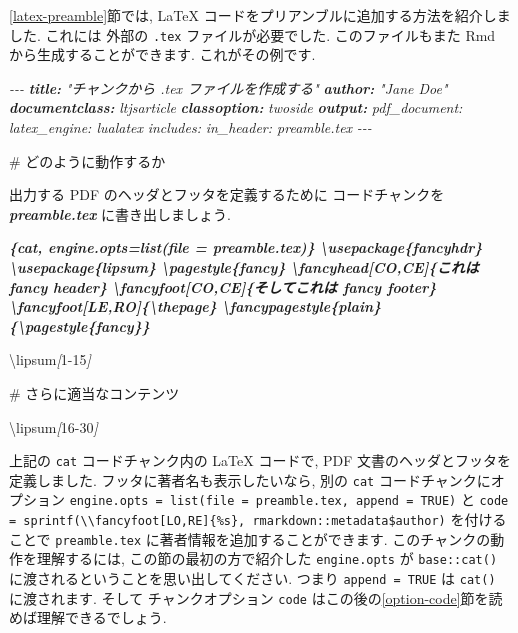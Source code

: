 \documentclass[
  11pt,
  lualatex,
  ja=standard]{bxjsreport}
\newenvironment{Shaded}{\begin{snugshade}}{\end{snugshade}}
\newcommand{\AnnotationTok}[1]{\textcolor[rgb]{0.56,0.35,0.01}{\textbf{\textit{#1}}}}
\newcommand{\CommentTok}[1]{\textcolor[rgb]{0.56,0.35,0.01}{\textit{#1}}}
\newcommand{\FunctionTok}[1]{\textcolor[rgb]{0.00,0.00,0.00}{#1}}
\newcommand{\InformationTok}[1]{\textcolor[rgb]{0.56,0.35,0.01}{\textbf{\textit{#1}}}}
\newcommand{\NormalTok}[1]{#1}
\newcommand{\OtherTok}[1]{\textcolor[rgb]{0.56,0.35,0.01}{#1}}
\begin{document}
\ref{latex-preamble}節では, LaTeX コードをプリアンブルに追加する方法を紹介しました. これには 外部の \texttt{.tex} ファイルが必要でした. このファイルもまた Rmd から生成することができます. これがその例です.

\begin{Shaded}
\begin{Highlighting}[]
\CommentTok{{-}{-}{-}}
\AnnotationTok{title:}\CommentTok{ "チャンクから .tex ファイルを作成する"}
\AnnotationTok{author:}\CommentTok{ "Jane Doe"}
\AnnotationTok{documentclass:}\CommentTok{ ltjsarticle}
\AnnotationTok{classoption:}\CommentTok{ twoside}
\AnnotationTok{output:}\CommentTok{ }
\CommentTok{  pdf\_document:}
\CommentTok{    latex\_engine: lualatex}
\CommentTok{    includes:}
\CommentTok{      in\_header: preamble.tex}
\CommentTok{{-}{-}{-}}

\FunctionTok{\# どのように動作するか}

\NormalTok{出力する PDF のヘッダとフッタを定義するために}
\NormalTok{コードチャンクを }\InformationTok{\textasciigrave{}preamble.tex\textasciigrave{}}\NormalTok{ に書き出しましょう.}

\InformationTok{\textasciigrave{}\textasciigrave{}\textasciigrave{}\{cat, engine.opts=list(file = \textquotesingle{}preamble.tex\textquotesingle{})\}}
\InformationTok{\textbackslash{}usepackage\{fancyhdr\}}
\InformationTok{\textbackslash{}usepackage\{lipsum\}}
\InformationTok{\textbackslash{}pagestyle\{fancy\}}
\InformationTok{\textbackslash{}fancyhead[CO,CE]\{これは fancy header\}}
\InformationTok{\textbackslash{}fancyfoot[CO,CE]\{そしてこれは fancy footer\}}
\InformationTok{\textbackslash{}fancyfoot[LE,RO]\{\textbackslash{}thepage\}}
\InformationTok{\textbackslash{}fancypagestyle\{plain\}\{\textbackslash{}pagestyle\{fancy\}\}}
\InformationTok{\textasciigrave{}\textasciigrave{}\textasciigrave{}}

\NormalTok{\textbackslash{}lipsum}\CommentTok{[}\OtherTok{1{-}15}\CommentTok{]}

\FunctionTok{\# さらに適当なコンテンツ}

\NormalTok{\textbackslash{}lipsum}\CommentTok{[}\OtherTok{16{-}30}\CommentTok{]}
\end{Highlighting}
\end{Shaded}

上記の \texttt{cat} コードチャンク内の LaTeX コードで, PDF 文書のヘッダとフッタを定義しました. フッタに著者名も表示したいなら, 別の \texttt{cat} コードチャンクにオプション \texttt{engine.opts = list(file = \textquotesingle{}preamble.tex\textquotesingle{},\ append\ =\ TRUE)} と \texttt{code = sprintf(\textquotesingle{}\textbackslash{}\textbackslash{}fancyfoot{[}LO,RE{]}\{\%s\}\textquotesingle{},\ rmarkdown::metadata\$author)} を付けることで \texttt{preamble.tex} に著者情報を追加することができます. このチャンクの動作を理解するには, この節の最初の方で紹介した \texttt{engine.opts} が \texttt{base::cat()} に渡されるということを思い出してください. つまり \texttt{append = TRUE} は \texttt{cat()} に渡されます. そして チャンクオプション \texttt{code} はこの後の\ref{option-code}節を読めば理解できるでしょう.
\end{document}
